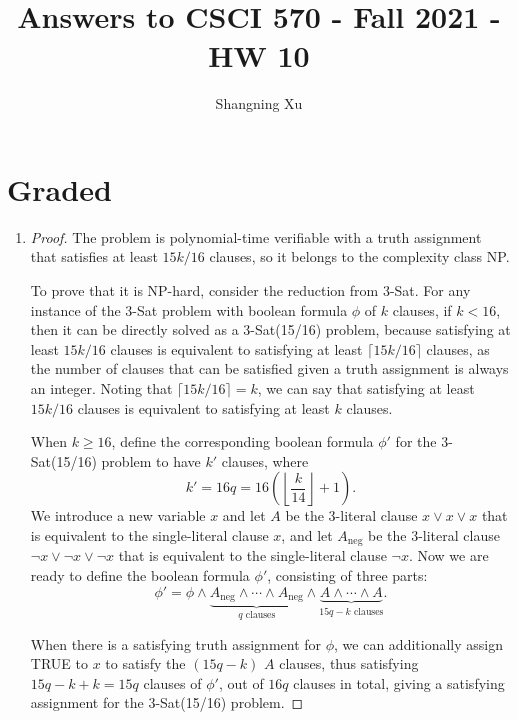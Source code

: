 \documentclass{article}
\title{Answers to CSCI 570 - Fall 2021 - HW 10}
\author{Shangning Xu}
\begin{document}
\maketitle

\section*{Graded}

\begin{enumerate}
    \item \begin{proof}
        The problem is polynomial-time verifiable with a truth assignment that satisfies at least $15k/16$ clauses, so it belongs to the complexity class NP.

        To prove that it is NP-hard, consider the reduction from 3-Sat. For any instance of the 3-Sat problem with boolean formula $\phi$ of $k$ clauses, if $k < 16$, then it can be directly solved as a 3-Sat(15/16) problem, because satisfying at least $15k/16$ clauses is equivalent to satisfying at least $\lceil 15k/16\rceil$ clauses, as the number of clauses that can be satisfied given a truth assignment is always an integer. Noting that $\lceil 15k/16\rceil = k$, we can say that satisfying at least $15k/16$ clauses is equivalent to satisfying at least $k$ clauses.
        
        When $k \ge 16$, define the corresponding boolean formula $\phi'$ for the 3-Sat(15/16) problem to have $k'$ clauses, where
        \[
            k' = 16q = 16\left(\left\lfloor\frac{k}{14}\right\rfloor + 1\right).
        \]
        We introduce a new variable $x$ and let $A$ be the 3-literal clause $x \lor x \lor x$ that is equivalent to the single-literal clause $x$, and let $A_\textrm{neg}$ be the 3-literal clause $\neg x \lor \neg x \lor \neg x$ that is equivalent to the single-literal clause $\neg x$. Now we are ready to define the boolean formula $\phi'$, consisting of three parts:
        \[
            \phi' = \phi \land \underbrace{A_\textrm{neg} \land \cdots \land A_\textrm{neg}}_{q\textrm{ clauses}} \land \underbrace{A \land \cdots \land A}_{15q - k\textrm{ clauses}}.
        \]

        When there is a satisfying truth assignment for $\phi$, we can additionally assign TRUE to $x$ to satisfy the $(15q - k)$ $A$ clauses, thus satisfying $15q - k + k = 15q$ clauses of $\phi'$, out of $16q$ clauses in total, giving a satisfying assignment for the 3-Sat(15/16) problem.
        

\end{proof}
\end{enumerate}
\end{document}
